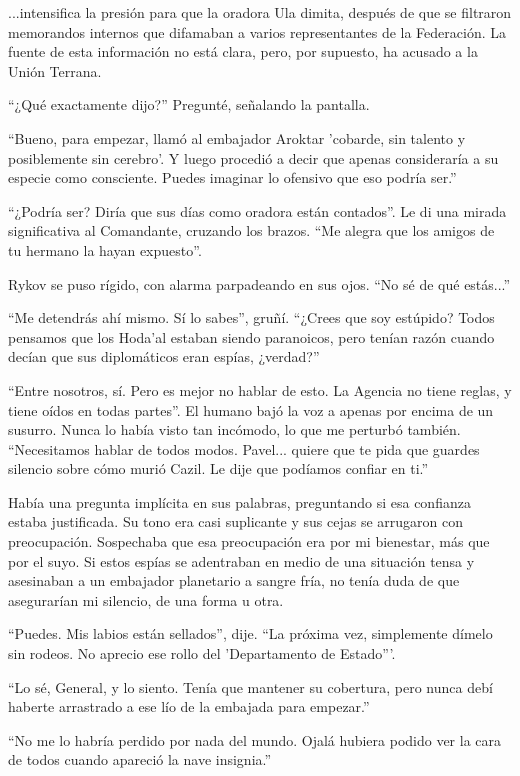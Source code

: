 \documentclass[spanish,12pt,a4paper,oneside,titlepage]{book}
\begin{document}
    ...intensifica la presión para que la oradora Ula dimita, después de que se filtraron memorandos internos que difamaban a varios representantes de la Federación. La fuente de esta información no está clara, pero, por supuesto, ha acusado a la Unión Terrana.

    ``¿Qué exactamente dijo?'' Pregunté, señalando la pantalla.

    ``Bueno, para empezar, llamó al embajador Aroktar 'cobarde, sin talento y posiblemente sin cerebro'. Y luego procedió a decir que apenas consideraría a su especie como consciente. Puedes imaginar lo ofensivo que eso podría ser.''

    ``¿Podría ser? Diría que sus días como oradora están contados''. Le di una mirada significativa al Comandante, cruzando los brazos. ``Me alegra que los amigos de tu hermano la hayan expuesto''.

    Rykov se puso rígido, con alarma parpadeando en sus ojos. ``No sé de qué estás...''

    ``Me detendrás ahí mismo. Sí lo sabes'', gruñí. ``¿Crees que soy estúpido? Todos pensamos que los Hoda'al estaban siendo paranoicos, pero tenían razón cuando decían que sus diplomáticos eran espías, ¿verdad?''

    ``Entre nosotros, sí. Pero es mejor no hablar de esto. La Agencia no tiene reglas, y tiene oídos en todas partes''. El humano bajó la voz a apenas por encima de un susurro. Nunca lo había visto tan incómodo, lo que me perturbó también. ``Necesitamos hablar de todos modos. Pavel... quiere que te pida que guardes silencio sobre cómo murió Cazil. Le dije que podíamos confiar en ti.''

    Había una pregunta implícita en sus palabras, preguntando si esa confianza estaba justificada. Su tono era casi suplicante y sus cejas se arrugaron con preocupación. Sospechaba que esa preocupación era por mi bienestar, más que por el suyo. Si estos espías se adentraban en medio de una situación tensa y asesinaban a un embajador planetario a sangre fría, no tenía duda de que asegurarían mi silencio, de una forma u otra.

    ``Puedes. Mis labios están sellados'', dije. ``La próxima vez, simplemente dímelo sin rodeos. No aprecio ese rollo del 'Departamento de Estado'''.

    ``Lo sé, General, y lo siento. Tenía que mantener su cobertura, pero nunca debí haberte arrastrado a ese lío de la embajada para empezar.''

    ``No me lo habría perdido por nada del mundo. Ojalá hubiera podido ver la cara de todos cuando apareció la nave insignia.''
\end{document}
